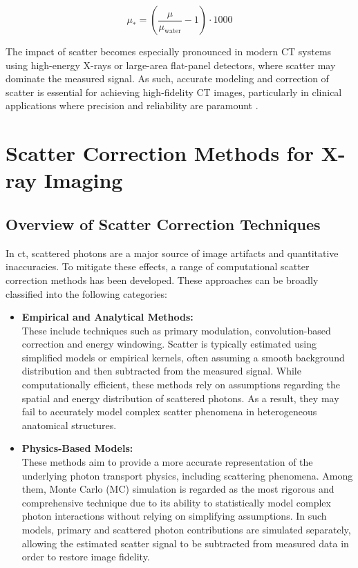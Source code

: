 $$\mu_* = \left(\frac{\mu}{\mu_{\text{water}}} -1\right) \cdot 1000$$

The impact of scatter becomes especially pronounced in modern CT systems using
high-energy X-rays or large-area flat-panel detectors, where scatter may
dominate the measured signal. As such, accurate modeling and correction of
scatter is essential for achieving high-fidelity CT images, particularly in
clinical applications where precision and reliability are paramount
\citep{medicalImagingSystemsIntro2019:}.


\section{Scatter Correction Methods for X-ray Imaging}

\subsection{Overview of Scatter Correction Techniques}

In \ac{ct}, scattered photons are a major source of image artifacts and
quantitative inaccuracies. To mitigate these effects, a range of computational
scatter correction methods has been developed. These approaches can be broadly
classified into the following categories:

\begin{itemize}
    \item \textbf{Empirical and Analytical Methods:} \\
        These include techniques such as primary modulation, convolution-based
        correction and energy windowing. Scatter is typically estimated using
        simplified models or empirical kernels, often assuming a smooth
        background distribution and then subtracted from the measured signal.
        While computationally efficient, these methods rely on assumptions
        regarding the spatial and energy distribution of scattered photons. As a
        result, they may fail to accurately model complex scatter phenomena in
        heterogeneous anatomical structures.
    \item \textbf{Physics-Based Models:} \\
        These methods aim to provide a more accurate representation of the
        underlying photon transport physics, including scattering phenomena.
        Among them, Monte Carlo (MC) simulation is regarded as the most rigorous
        and comprehensive technique due to its ability to statistically model
        complex photon interactions without relying on simplifying assumptions.
        In such models, primary and scattered photon contributions are simulated
        separately, allowing the estimated scatter signal to be subtracted from
        measured data in order to restore image fidelity.
\end{itemize}

